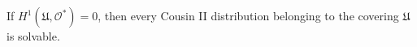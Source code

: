 If $H^1(\mathfrak{U}, \mathcal{O}^*) = 0$, then every Cousin II distribution belonging to the covering $\mathfrak{U}$ is solvable.
